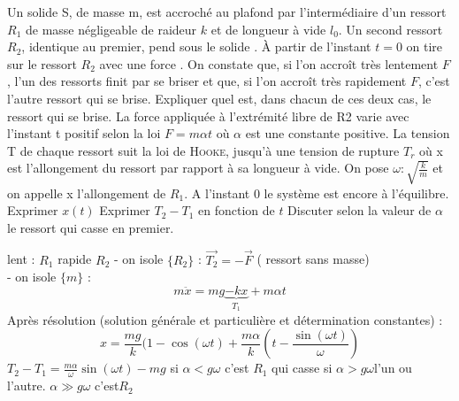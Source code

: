 \begin{Exercise}[title=Suite de ressort]
  Un solide S, de masse m, est accroché au plafond par l’intermédiaire d’un
  ressort $R_1$ de masse négligeable de raideur $k$ et de longueur à vide $l_0$.
  Un second ressort $R_2$, identique au premier, pend sous le solide . À partir
  de l’instant $t = 0$ on tire sur le ressort $R_2$ avec une force . On constate
  que, si l’on accroît très lentement $F$ , l’un des ressorts finit par se
  briser et que, si l’on accroît très rapidement $ F$, c’est l’autre ressort qui
  se brise.
  \Question Expliquer quel est, dans chacun de ces deux cas, le ressort
  qui se brise.
  \Question La force appliquée à l’extrémité libre de R2 varie
  avec l’instant t positif selon la loi $F=m\alpha t$ où $\alpha$ est une
  constante positive. La tension T de chaque ressort suit la loi de \textsc{Hooke},
  jusqu’à une tension de rupture $T_r$ où x est l’allongement du ressort par
  rapport à sa longueur à vide. On pose $\omega:\sqrt{\frac{k}{m}}$ et on
  appelle x l'allongement de $R_1$. A l'instant 0 le système est encore à
  l'équilibre. Exprimer $x(t)$
  \Question Exprimer $T_2-T_1$ en fonction de $t$
  \Question Discuter selon la valeur de $\alpha$ le ressort qui casse en premier.
\end{Exercise}
\begin{Answer}
  \Question lent : $R_1$ rapide $R_2$
  \Question - on isole $\{R_2\}$ : $\vec{T_2} = -\vec{F}$ ( ressort sans masse) \\
  - on isole $\{m\}$ :
  \[ m\ddot{x} = mg \underbrace{-kx}_{T_1} + m\alpha t\]
  Après résolution (solution générale et particulière et détermination
  constantes) :
  \[x= \frac{mg}{k}(1-\cos(\omega t) +\frac{m\alpha}{k}\left(t-\frac{\sin(\omega
        t)}{\omega}\right)\]
  \Question
  $ T_2-T_1 =\frac{m\alpha}{\omega}\sin(\omega t) -mg$
  \Question si $\alpha < g\omega$ c'est $R_1$ qui casse si $\alpha > g\omega$l'un ou l'autre. $\alpha \gg
  g\omega$ c'est$ R_2$
\end{Answer}
